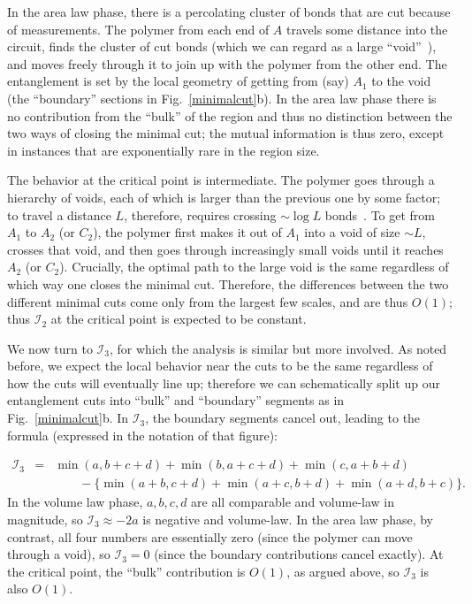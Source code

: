 \documentclass[prl,twocolumn,aps,showpacs,amsmath,amssymb,superscriptaddress,floatfix,longbibliography]{revtex4-1}
\begin{document}
In the area law phase, there is a percolating cluster of bonds that are cut because of measurements. The polymer from each end of $A$ travels some distance into the circuit, finds the cluster of cut bonds (which we can regard as a large ``void''~\cite{Skinner2019}), and moves freely through it to join up with the polymer from the other end. The entanglement is set by the local geometry of getting from (say) $A_1$ to the void (the ``boundary'' sections in Fig.~\ref{minimalcut}b). In the area law phase there is no contribution from the ``bulk'' of the region and thus no distinction between the two ways of closing the minimal cut; the mutual information is thus zero, except in instances that are exponentially rare in the region size. 

The behavior at the critical point is intermediate. The polymer goes through a hierarchy of voids, each of which is larger than the previous one by some factor; to travel a distance $L$, therefore, requires crossing $\sim \log L$ bonds~\cite{Skinner2019}. To get from $A_1$ to $A_2$ (or $C_2$), the polymer first makes it out of $A_1$ into a void of size $\sim L$, crosses that void, and then goes through increasingly small voids until it reaches $A_2$ (or $C_2$). Crucially, the optimal path to the large void is the same regardless of which way one closes the minimal cut. Therefore, the differences between the two different minimal cuts come only from the largest few scales, and are thus $O(1)$; thus $\mathcal{I}_2$ at the critical point is expected to be constant. 

We now turn to $\mathcal{I}_3$, for which the analysis is similar but more involved. As noted before, we expect the local behavior near the cuts to be the same regardless of how the cuts will eventually line up; therefore we can schematically split up our entanglement cuts into ``bulk'' and ``boundary'' segments as in Fig.~\ref{minimalcut}b. 
In $\mathcal{I}_3$, the boundary segments cancel out, leading to the formula (expressed in the notation of that figure):

\begin{eqnarray}\label{i3mincut}
\mathcal{I}_3 & = & \min(a, b + c + d) + \min(b, a + c + d) + \min(c, a + b + d) \nonumber \\ && \qquad - \{ \min(a + b, c + d) + \min(a + c, b + d) + \min(a + d, b + c) \}.
\end{eqnarray}
In the volume law phase, $a,b,c,d$ are all comparable and volume-law in magnitude, so $\mathcal{I}_3 \approx -2a$ is negative and volume-law. In the area law phase, by contrast, all four numbers are essentially zero (since the polymer can move through a void), so $\mathcal{I}_3 = 0$ (since the boundary contributions cancel exactly). At the critical point, the ``bulk'' contribution is $O(1)$, as argued above, so $\mathcal{I}_3$ is also $O(1)$. 
\end{document}
